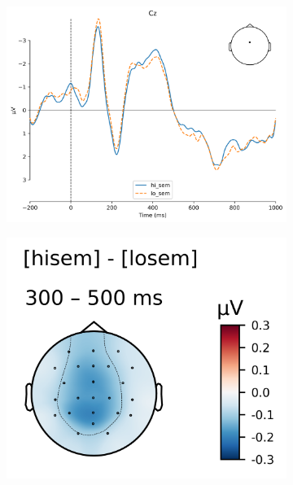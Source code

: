 \documentclass[a4paper, man, floatsintext]{apa7}
\begin{document}
\begin{figure}[H]
    \caption{Brain responses elicited by the critical verb. (a) ERPs for semantic interference (word onset at 0\,ms) at electrode Cz. (b) Topographic map of the semantic interference effect (high semantic interference - low semantic interference) in the N400 time window. (c) ERPs for syntactic interference  (word onset at 0\,ms) at electrode Cz. (d) Topographic map of the syntactic interference effect (high syntactic interference - low syntactic interference) in the N400 time window.}
    \label{fig:erp_sem_syn}
    \centering
         \begin{subfigure}[t]{0.74\textwidth}
         \centering
        \caption{}
         \label{fig:erp_sem_ERP}
         \includegraphics[width=\textwidth]{images/ERP_animacy_Cz.png}
     \end{subfigure}
     \hfill
     \begin{subfigure}[t]{0.25\textwidth}
         \centering
        \caption{}
         \label{fig:erp_sem_topo}
         \includegraphics[width=\textwidth]{images/topo_animate-inanimate_300_500.png}
     \end{subfigure}


\end{figure}
\end{document}

